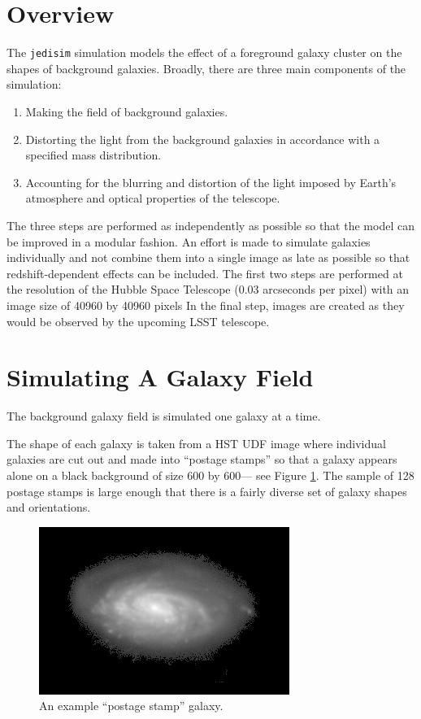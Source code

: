 \documentclass[10pt,twoside]{article}
\theoremstyle{definition}
\theoremstyle{exercise}
\begin{document}
\section{Overview}
The \texttt{jedisim} simulation models the effect of a foreground galaxy cluster on the shapes of background galaxies. Broadly, there are three main components of the simulation:
\begin{enumerate}
  \item Making the field of background galaxies.
  \item Distorting the light from the background galaxies in accordance with a specified mass distribution.
  \item Accounting for the blurring and distortion of the light imposed by Earth's atmosphere and optical properties of the telescope.
\end{enumerate}
The three steps are performed as independently as possible so that the model can be improved in a modular fashion. An effort is made to simulate galaxies individually and not combine them into a single image as late as possible so that redshift-dependent effects can be included. The first two steps are performed at the resolution of the Hubble Space Telescope (0.03 arcseconds per pixel) with an image size of 40960 by 40960 pixels In the final step, images are created as they would be observed by the upcoming LSST telescope.

\section{Simulating A Galaxy Field}
The background galaxy field is simulated one galaxy at a time. 


The shape of each galaxy is taken from a HST UDF image where individual galaxies are cut out and made into ``postage stamps'' so that a galaxy appears alone on a black background of size 600 by 600--- see Figure \ref{fig:postage_stamp}. The sample of 128 postage stamps is large enough that there is a fairly diverse set of galaxy shapes and orientations.

\begin{figure}
  \begin{center}
    \includegraphics[scale=10]{images/example_galaxy.png}
  \end{center}
  \caption{An example ``postage stamp'' galaxy.}
  \label{fig:postage_stamp}
\end{figure}
\end{document}
